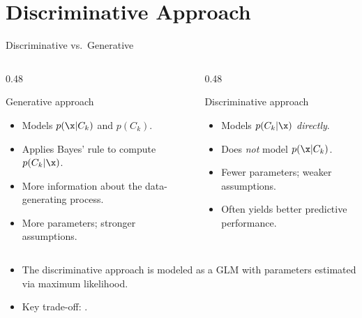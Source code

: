\section{Discriminative Approach}

\begin{frame}{Discriminative vs.\ Generative}
  \begin{columns}[T]
    \begin{column}{0.48\textwidth}
      \begin{block}{Generative approach}
        \begin{itemize}
          \item Models $p(\x|C_k)$ and $p(C_k)$.
          \item Applies Bayes' rule to compute $p(C_k|\x)$.
          \item More information about the data-generating process.
          \item More parameters; stronger assumptions.
        \end{itemize}
      \end{block}
    \end{column}
    \begin{column}{0.48\textwidth}
      \begin{block}{Discriminative approach}
        \begin{itemize}
          \item Models $p(C_k|\x)$ \emph{directly}.
          \item Does \emph{not} model $p(\x|C_k)$.
          \item Fewer parameters; weaker assumptions.
          \item Often yields better predictive performance.
        \end{itemize}
      \end{block}
    \end{column}
  \end{columns}
  \vspace{0.3cm}
  \begin{itemize}
    \item The discriminative approach is modeled as a GLM with parameters estimated via maximum likelihood.
    \item Key trade-off: .
  \end{itemize}
\end{frame}

